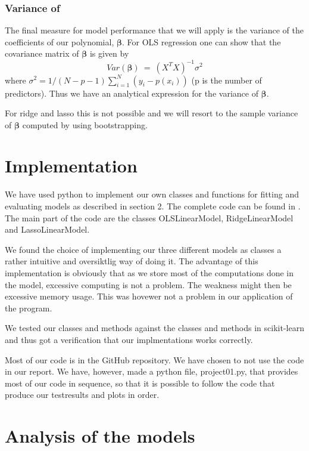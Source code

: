 \documentclass[a4paper,norsk]{article}
\begin{document}
\subsubsection{Variance of \bm{$\beta$}}
The final measure for model performance that we will apply is the variance 
of the coefficients of our polynomial, $\bm{\beta}$. For OLS regression
one can show that the covariance matrix of $\bm{\beta}$ is given by
\begin{equation}
    Var(\bm{\beta}) \ = \ (X^TX)^{-1} \sigma^2
\end{equation}
where $\sigma^2 = 1/(N - p - 1) \sum_{i=1}^N (y_i - p(x_i))$ 
(p is the number of predictors). Thus we have an analytical expression for 
the variance of $\bm{\beta}$.
\par
For ridge and lasso this is not possible and we will resort to the sample 
variance of $\bm{\beta}$ computed by using bootstrapping.

\section{Implementation}
We have used python to implement our own classes and functions for 
fitting and evaluating models as described in section 2.  
The complete code can be found in \cite{hastie}. The main part of the code
are the classes OLSLinearModel, RidgeLinearModel and LassoLinearModel. 
\par
We found the choice of implementing our three different models as classes 
a rather intuitive and oversiktlig way of doing it. The advantage of this
implementation is obviously that as we store most of the computations 
done in the model, excessive computing is not
a problem. The weakness might then be excessive memory usage. This was 
hovewer not a problem in our application of the program.
\par
We tested our classes and methods against the classes and methods in 
scikit-learn and thus got a verification that our implmentations 
works correctly.
\par 
Most of our code is in the GitHub repository. We have chosen to 
not use the code in our report. We have, however, made a python file, 
project01.py, that provides most of our code in sequence, 
so that it is possible to follow the code that produce our testresults 
and plots in order.

\section{Analysis of the models}
\end{document}
